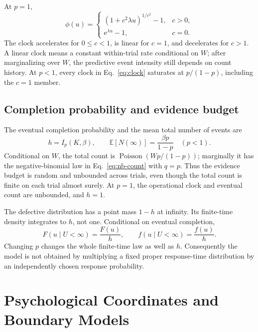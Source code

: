 \documentclass[12pt]{article}
\newcommand{\e}{\mathrm{e}}
\newcommand{\Poisson}{\operatorname{Poisson}}
\newcommand{\E}{\mathbb{E}}
\theoremstyle{definition}
\theoremstyle{plain}
\theoremstyle{remark}
\begin{document}
At $p=1$,
\begin{equation}
 \phi(u)=
 \begin{cases}
 (1+c^2\lambda u)^{1/c^2}-1,&c>0,\\
 \e^{\lambda u}-1,&c=0.
 \end{cases}\label{eq:proper-clock}
\end{equation}
The clock accelerates for $0\leq c<1$, is linear for $c=1$, and decelerates for $c>1$. A linear clock means a constant within-trial rate conditional on $W$; after marginalizing over $W$, the predictive event intensity still depends on count history. At $p<1$, every clock in Eq.~\eqref{eq:clock} saturates at $p/(1-p)$, including the $c=1$ member.

\subsection{Completion probability and evidence budget}\label{sec:defect}
The eventual completion probability and the mean total number of events are
\begin{equation}
 h=I_p(K,\beta),\qquad
 \E[N(\infty)]=\frac{\beta p}{1-p}\quad(p<1).\label{eq:budget}
\end{equation}
Conditional on $W$, the total count is $\Poisson(Wp/(1-p))$; marginally it has the negative-binomial law in Eq.~\eqref{eq:nb-count} with $q=p$. Thus the evidence budget is random and unbounded across trials, even though the total count is finite on each trial almost surely. At $p=1$, the operational clock and eventual count are unbounded, and $h=1$.

The defective distribution has a point mass $1-h$ at infinity. Its finite-time density integrates to $h$, not one. Conditional on eventual completion,
\begin{equation}
 F(u\mid U<\infty)=\frac{F(u)}h,\qquad
 f(u\mid U<\infty)=\frac{f(u)}h.\label{eq:conditional-completion}
\end{equation}
Changing $p$ changes the whole finite-time law as well as $h$. Consequently the model is not obtained by multiplying a fixed proper response-time distribution by an independently chosen response probability.

\section{Psychological Coordinates and Boundary Models}\label{sec:coordinates}
\end{document}
